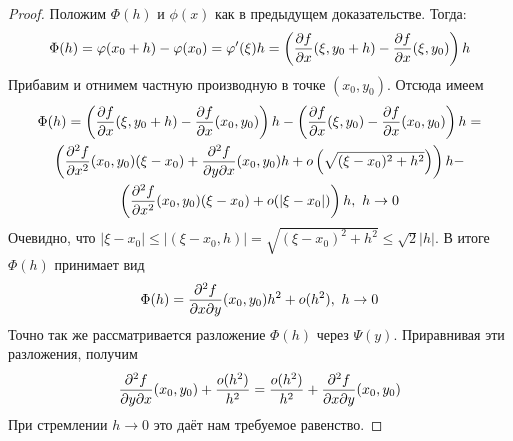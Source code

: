 \begin{proof}
	Положим $\Phi(h)$ и $\phi(x)$ как в предыдущем доказательстве. Тогда:
	\[
		\Phi(h) = \varphi(x_0 + h) - \varphi(x_0) = \varphi'(\xi) h = \left(\frac{\partial f}{\partial x} (\xi, y_0 + h) - \frac{\partial f}{\partial x} (\xi, y_0)\right) h
	\]
	Прибавим и отнимем частную производную в точке $(x_0, y_0)$. Отсюда имеем
	\begin{multline*}
		\Phi(h) = \left(\frac{\partial f}{\partial x} (\xi, y_0 + h) - \frac{\partial f}{\partial x} (x_0, y_0)\right) h - \left(\frac{\partial f}{\partial x} (\xi, y_0) - \frac{\partial f}{\partial x} (x_0, y_0)\right) h =
		\\
		\left(\frac{\partial^2 f}{\partial x^2} (x_0, y_0) (\xi - x_0) + \frac{\partial^2 f}{\partial y \partial x} (x_0, y_0) h + o\left(\sqrt{(\xi - x_0)^2 + h^2}\right)\right) h -
		\\
		\left(\frac{\partial^2 f}{\partial x^2} (x_0, y_0) (\xi - x_0) + o(|\xi - x_0|)\right) h,\ h\to 0
	\end{multline*}
	Очевидно, что $|\xi - x_0| \leq |(\xi - x_0, h)| = \sqrt{(\xi - x_0)^2 + h^2} \leq \sqrt{2}|h|$.
	В итоге $\Phi(h)$ принимает вид
	\[
		\Phi(h) = \frac{\partial^2 f}{\partial x \partial y} (x_0, y_0) h^2 + o(h^2),\ h\to 0
	\]
	Точно так же рассматривается разложение $\Phi(h)$ через $\Psi(y)$. Приравнивая эти разложения, получим
	\[
		\frac{\partial^2 f}{\partial y \partial x} (x_0, y_0) + \frac{o(h^2)}{h^2} = \frac{o(h^2)}{h^2} + \frac{\partial^2 f}{\partial x \partial y} (x_0, y_0)
	\]
	При стремлении $h \to 0$ это даёт нам требуемое равенство.
\end{proof}

